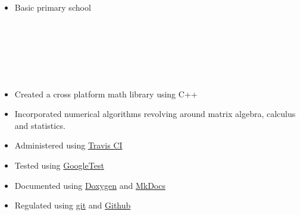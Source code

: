 \documentclass[11pt,a4paper,ragged2e]{altacv}
\begin{document}
\begin{paracol}{2}
\divider
{}
\begin{itemize}
\item Basic primary school
\end{itemize}

 \\
\vspace{0.5mm}
 \\
\vspace{0.5mm}
 \\
\divider \\
\\
\vspace{0.5mm}
 \smallskip

\divider
{}




\switchcolumn
\newpage
{}
\begin{itemize}
\item Created a cross platform math library using C++
\item Incorporated numerical algorithms revolving around matrix algebra, calculus and statistics.
\item Administered using \href{https://travis-ci.org/}{Travis CI}
\item Tested using \href{https://github.com/google/googletest}{GoogleTest}
\item Documented using \href{https://www.doxygen.nl/index.html}{Doxygen} and \href{https://www.mkdocs.org/}{MkDocs}
\item Regulated using \href{https://git-scm.com/}{git} and \href{https://github.com/}{Github}
\end{itemize}
\divider


\end{paracol}
\end{document}
